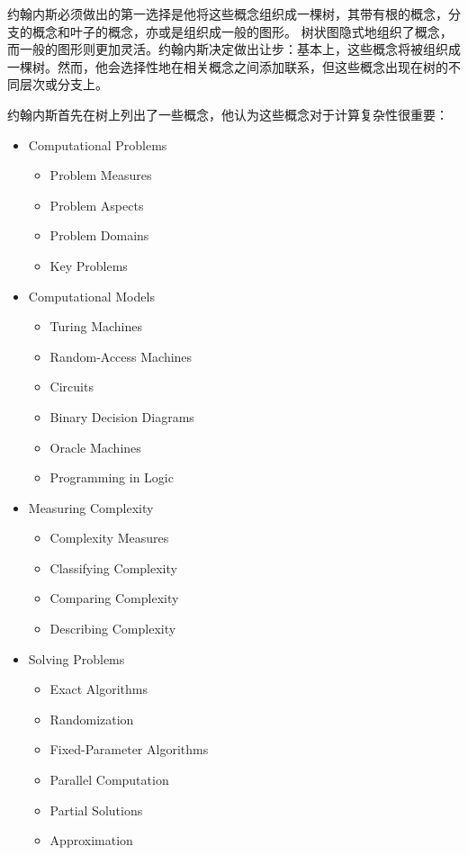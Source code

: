 约翰内斯必须做出的第一选择是他将这些概念组织成一棵树，其带有根的概念，分支的概念和叶子的概念，亦或是组织成一般的图形。 树状图隐式地组织了概念，而一般的图形则更加灵活。约翰内斯决定做出让步：基本上，这些概念将被组织成一棵树。然而，他会选择性地在相关概念之间添加联系，但这些概念出现在树的不同层次或分支上。


约翰内斯首先在树上列出了一些概念，他认为这些概念对于计算复杂性很重要：

\begin{itemize}
  \item Computational Problems
      \begin{itemize}\itemsep=0pt\parskip=0pt
          \item Problem Measures
          \item Problem Aspects
          \item Problem Domains
          \item Key Problems
      \end{itemize}
  \item Computational Models
      \begin{itemize}\itemsep=0pt\parskip=0pt
          \item Turing Machines
          \item Random-Access Machines
          \item Circuits
          \item Binary Decision Diagrams
          \item Oracle Machines
          \item Programming in Logic
      \end{itemize}
  \item Measuring Complexity
      \begin{itemize}\itemsep=0pt\parskip=0pt
          \item Complexity Measures
          \item Classifying Complexity
          \item Comparing Complexity
          \item Describing Complexity
      \end{itemize}
  \item Solving Problems
      \begin{itemize}\itemsep=0pt\parskip=0pt
          \item Exact Algorithms
          \item Randomization
          \item Fixed-Parameter Algorithms
          \item Parallel Computation
          \item Partial Solutions
          \item Approximation
      \end{itemize}
\end{itemize}


